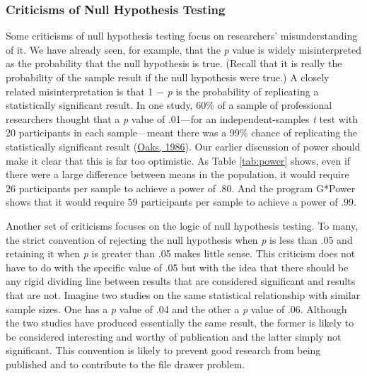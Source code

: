 \documentclass[
]{krantz}
\begin{document}
\hypertarget{criticisms-of-null-hypothesis-testing}{%
\subsubsection*{Criticisms of Null Hypothesis Testing}\label{criticisms-of-null-hypothesis-testing}}


Some criticisms of null hypothesis testing focus on researchers' misunderstanding of it. We have already seen, for example, that the \emph{p} value is widely misinterpreted as the probability that the null hypothesis is true. (Recall that it is really the probability of the sample result if the null hypothesis were true.) A closely related misinterpretation is that 1 − \emph{p} is the probability of replicating a statistically significant result. In one study, 60\% of a sample of professional researchers thought that a \emph{p} value of .01---for an independent-samples \emph{t} test with 20 participants in each sample---meant there was a 99\% chance of replicating the statistically significant result (\protect\hyperlink{ref-oaks1986statistical}{Oaks, 1986}). Our earlier discussion of power should make it clear that this is far too optimistic. As Table \ref{tab:power} shows, even if there were a large difference between means in the population, it would require 26 participants per sample to achieve a power of .80. And the program G*Power shows that it would require 59 participants per sample to achieve a power of .99.

Another set of criticisms focuses on the logic of null hypothesis testing. To many, the strict convention of rejecting the null hypothesis when \emph{p} is less than .05 and retaining it when \emph{p} is greater than .05 makes little sense. This criticism does not have to do with the specific value of .05 but with the idea that there should be any rigid dividing line between results that are considered significant and results that are not. Imagine two studies on the same statistical relationship with similar sample sizes. One has a \emph{p} value of .04 and the other a \emph{p} value of .06. Although the two studies have produced essentially the same result, the former is likely to be considered interesting and worthy of publication and the latter simply not significant. This convention is likely to prevent good research from being published and to contribute to the file drawer problem.
\end{document}
